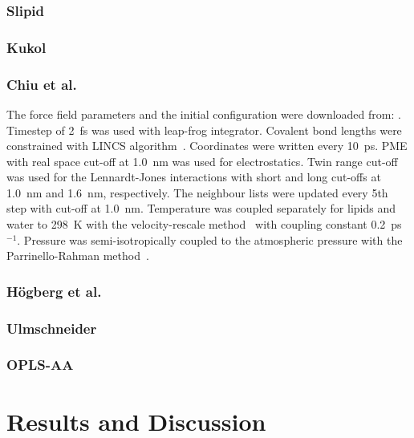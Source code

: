 \documentclass[pre,aps,floatfix,authordate1-4,twocolumn]{revtex4-1}
\begin{document}
\subsubsection{Slipid}
\subsubsection{Kukol}
\subsubsection{Chiu et al.}
The force field parameters and the initial configuration were downloaded from: .
Timestep of 2~fs was used with leap-frog integrator. Covalent bond lengths were constrained with LINCS algorithm~\cite{hess97,hess07}. 
Coordinates were written every 10~ps. PME with real space cut-off at 1.0~nm was used 
for electrostatics. Twin range cut-off was used for the Lennardt-Jones interactions with short and long cut-offs at 1.0~nm and 1.6~nm, respectively.
The neighbour lists were updated every 5th step with cut-off at 1.0~nm. Temperature was coupled separately
for lipids and water to 298~K with the velocity-rescale method~\cite{bussi07} with coupling constant 0.2~ps$^{-1}$.
Pressure was semi-isotropically coupled to the atmospheric pressure with the Parrinello-Rahman method~\cite{parrinello81}.
\subsubsection{H\"ogberg et al.}
\subsubsection{Ulmschneider}
\subsubsection{OPLS-AA}


\section{Results and Discussion}
\end{document}
